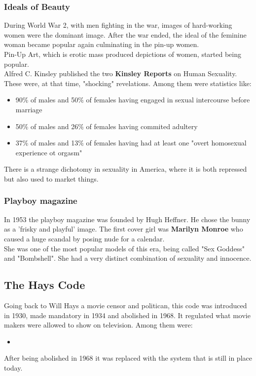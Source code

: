 \documentclass{article}
\begin{document}
	\subsubsection{Ideals of Beauty}
	During World War 2, with men fighting in the war, images of hard-working women were the dominant image. After the war ended, the ideal of the feminine woman became popular again culminating in the pin-up women. \\
	Pin-Up Art, which is erotic mass produced depictions of women, started being popular. \\
	Alfred C. Kinsley published the two \textbf{Kinsley Reports} on Human Sexuality. These were, at that time, "shocking" revelations. Among them were statistics like:
	\begin{itemize}
		\item{90\% of males and 50\% of females having engaged in sexual intercourse before marriage}
		\item{50\% of males and 26\% of females having commited adultery}
		\item{37\% of males and 13\% of females having had at least one "overt homosexual experience ot orgasm"}
	\end{itemize}
	There is a strange dichotomy in sexuality in America, where it is both repressed but also used to market things. \\
	\subsubsection{Playboy magazine}
	In 1953 the playboy magazine was founded by Hugh Heffner. He chose the bunny as a 'frisky and playful' image. The first cover girl was \textbf{Marilyn Monroe} who caused a huge scandal by posing nude for a calendar. \\
	She was one of the most popular models of this era, being called "Sex Goddess" and "Bombshell". She had a very distinct combination of sexuality and innocence. \\
	\subsection{The Hays Code}
	Going back to Will Hays a movie censor and politican, this code was introduced in 1930, made mandatory in 1934 and abolished in 1968. It regulated what movie makers were allowed to show on television. Among them were:
	\begin{itemize}
		\item{}
	\end{itemize}
	After being abolished in 1968 it was replaced with the system that is still in place today.
\end{document}
